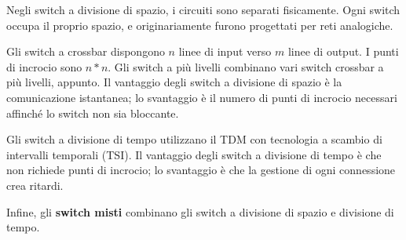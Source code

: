         \vspace{3mm}
        
        Negli switch a divisione di spazio, i circuiti sono separati fisicamente. Ogni switch occupa il proprio spazio, e originariamente furono progettati per reti analogiche. 
        
        Gli switch a crossbar dispongono $n$ linee di input verso $m$ linee di output. I punti di incrocio sono $n*n$. Gli switch a più livelli combinano vari switch crossbar a più livelli, appunto. Il vantaggio degli switch a divisione di spazio è la comunicazione istantanea; lo svantaggio è il numero di punti di incrocio necessari affinché lo switch non sia bloccante.
        
        Gli switch a divisione di tempo utilizzano il TDM con tecnologia a scambio di intervalli temporali (TSI). Il vantaggio degli switch a divisione di tempo è che non richiede punti di incrocio; lo svantaggio è che la gestione di ogni connessione crea ritardi.
        
        Infine, gli \textbf{switch misti} combinano gli switch a divisione di spazio e divisione di tempo.